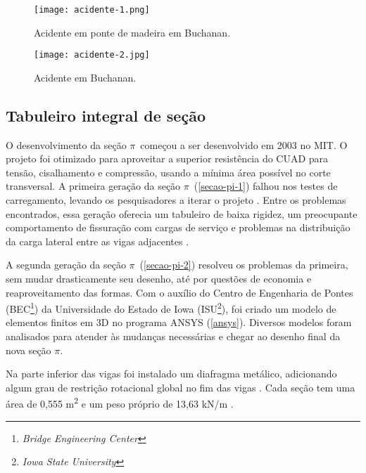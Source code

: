 \begin{figure}[htb]
	\caption{\label{acidente-1}Acidente em ponte de madeira em Buchanan.}
	\begin{center}
		\texttt{[image: acidente-1.png]}
	\end{center}
\end{figure}

\begin{figure}[htb]
	\caption{\label{acidente-2}Acidente em Buchanan.}
	\begin{center}
		\texttt{[image: acidente-2.jpg]}
	\end{center}
\end{figure}

\subsection{Tabuleiro integral de seção \textpi}

O desenvolvimento da seção $ \pi $~começou a ser desenvolvido em 2003 no MIT. O projeto foi otimizado para aproveitar a superior resistência do CUAD para tensão, cisalhamento e compressão, usando a mínima área possível no corte transversal. A primeira geração da seção $ \pi $~(\autoref{secao-pi-1}) falhou nos testes de carregamento, levando os pesquisadores a iterar o projeto \cite[p.~4]{Rouse}. Entre os problemas encontrados, essa geração oferecia um tabuleiro de baixa rigidez, um preocupante comportamento de fissuração com cargas de serviço e problemas na distribuição da carga lateral entre as vigas adjacentes .

A segunda geração da seção $ \pi $~(\autoref{secao-pi-2}) resolveu os problemas da primeira, sem mudar drasticamente seu desenho, até por questões de economia e reaproveitamento das formas. Com o auxílio do Centro de Engenharia de Pontes (BEC\footnote{\textit{Bridge Engineering Center}}) da Universidade do Estado de Iowa (ISU\footnote{\textit{Iowa State University}}), foi criado um modelo de elementos finitos em 3D no programa ANSYS (\autoref{ansys}). Diversos modelos foram analisados para atender às mudanças necessárias e chegar ao desenho final da nova seção $ \pi $.

Na parte inferior das vigas foi instalado um diafragma metálico, adicionando algum grau de restrição rotacional global no fim das vigas \cite[p.~7]{Rouse}. Cada seção tem uma área de 0,555 m\textsuperscript{2} e um peso próprio de 13,63 kN/m \cite[p.~8]{Rouse}.

